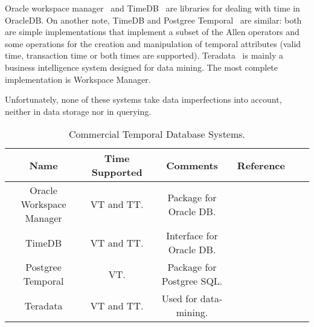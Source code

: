 Oracle workspace manager~\cite{oracle2009} and TimeDB~\cite{timedb2005} are libraries for dealing with time in OracleDB. On another note, TimeDB and Postgree Temporal~\cite{posgree2009} are similar: both are simple implementations that implement a subset of the Allen operators and some operations for the creation and manipulation of temporal attributes (valid time, transaction time or both times are supported). Teradata~\cite{teradata2011} is mainly a business intelligence system designed for data mining. The most complete implementation is Workspace Manager.

Unfortunately, none of these systems take data imperfections into account, neither in data storage nor in querying.

\begin{table}
\centering
\caption{Commercial Temporal Database Systems. }
\begin{tabular}{c c c c c c }
\hline
\textbf{Name} & \textbf{Time Supported} & \textbf{Comments} & \textbf{Reference}  \\ \hline
Oracle Workspace Manager & VT and TT. & Package for Oracle DB. & \cite{oracle2009}\\
TimeDB & VT and TT. & Interface for Oracle DB. & \cite{timedb2005}\\
Postgree Temporal & VT. & Package for Postgree SQL. & \cite{posgree2009}\\
Teradata & VT and TT. & Used for data-mining. & \cite{teradata2011}\\
\hline 
\end{tabular}
\label{table:commercial-temporal-db}



\end{table}

